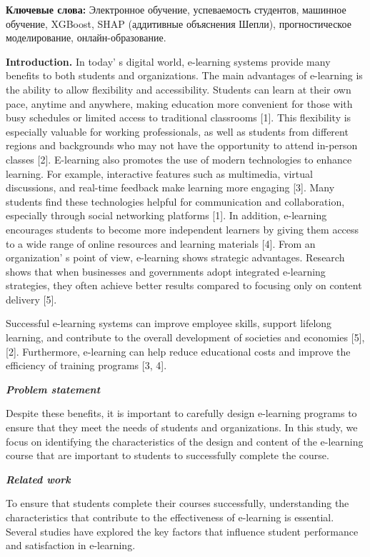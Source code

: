 {\bfseries Ключевые слова:} Электронное обучение, успеваемость студентов,
машинное обучение, XGBoost, SHAP (аддитивные объяснения Шепли),
прогностическое моделирование, онлайн-образование.

\begin{multicols}{2}
{\bfseries Introduction.} In today' s digital world,
e-learning systems provide many benefits to both students and
organizations. The main advantages of e-learning is the ability to allow
flexibility and accessibility. Students can learn at their own pace,
anytime and anywhere, making education more convenient for those with
busy schedules or limited access to traditional classrooms {[}1{]}. This
flexibility is especially valuable for working professionals, as well as
students from different regions and backgrounds who may not have the
opportunity to attend in-person classes {[}2{]}. E-learning also
promotes the use of modern technologies to enhance learning. For
example, interactive features such as multimedia, virtual discussions,
and real-time feedback make learning more engaging {[}3{]}. Many
students find these technologies helpful for communication and
collaboration, especially through social networking platforms {[}1{]}.
In addition, e-learning encourages students to become more independent
learners by giving them access to a wide range of online resources and
learning materials {[}4{]}. From an organization' s point
of view, e-learning shows strategic advantages. Research shows that when
businesses and governments adopt integrated e-learning strategies, they
often achieve better results compared to focusing only on content
delivery {[}5{]}.

Successful e-learning systems can improve employee skills, support
lifelong learning, and contribute to the overall development of
societies and economies {[}5{]}, {[}2{]}. Furthermore, e-learning can
help reduce educational costs and improve the efficiency of training
programs {[}3, 4{]}.

\emph{{\bfseries Problem statement}}

Despite these benefits, it is important to carefully design e-learning
programs to ensure that they meet the needs of students and
organizations. In this study, we focus on identifying the
characteristics of the design and content of the e-learning course that
are important to students to successfully complete the course.

\emph{{\bfseries Related work}}

To ensure that students complete their courses successfully,
understanding the characteristics that contribute to the effectiveness
of e-learning is essential. Several studies have explored the key
factors that influence student performance and satisfaction in
e-learning.


\end{multicols}
